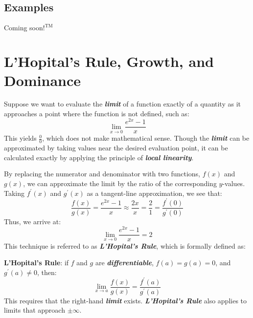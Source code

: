 \begin{center}
\section*{\small Examples}
Coming soon$!^{\text{TM}}$
\end{center}

\section{L'Hopital's Rule, Growth, and Dominance}
Suppose we want to evaluate the \textbf{\textit{limit}} of a function exactly of a quantity as it approaches a point where the function is not defined, such as:
%
\begin{equation}
\lim_{x \rightarrow 0} \frac{e^{2x} - 1}{x}
\end{equation}
%
This yields $\frac{0}{0}$, which does not make mathematical sense. Though the \textbf{\textit{limit}} can be approximated by taking values near the desired evaluation point, it can be calculated exactly by applying the principle of \textbf{\textit{local linearity}}.

\vspace{0.1in}
By replacing the numerator and denominator with two functions, $f(x)$ and $g(x)$, we can approximate the limit by the ratio of the corresponding $y$-values. Taking $f^\prime(x)$ and $g^\prime(x)$ as a tangent-line approximation, we see that:
%
\begin{equation}
\frac{f(x)}{g(x)} = \frac{e^{2x} - 1}{x} \approx \frac{2x}{x} = \frac{2}{1} = \frac{f^\prime(0)}{g^\prime(0)}
\end{equation}
Thus, we arrive at:
%
\begin{equation}
\lim_{x \rightarrow 0} \frac{e^{2x} - 1}{x} = 2
\end{equation}
%
This technique is referred to as \textbf{\textit{L'Hopital's Rule}}, which is formally defined as:
%

\vspace{0.1in}
\textbf{L'Hopital's Rule}: if $f$ and $g$ are \textbf{\textit{differentiable}}, $f(a) = g(a) = 0$, and $g^\prime(a) \neq 0$, then:
%
\begin{equation}
\lim_{x \rightarrow a} \frac{f(x)}{g(x)} = \frac{f^\prime(a)}{g^\prime(a)}
\end{equation}
%
This requires that the right-hand \textbf{\textit{limit}} exists. \textbf{\textit{L'Hopital's Rule}} also applies to limits that approach $\pm \infty$.

